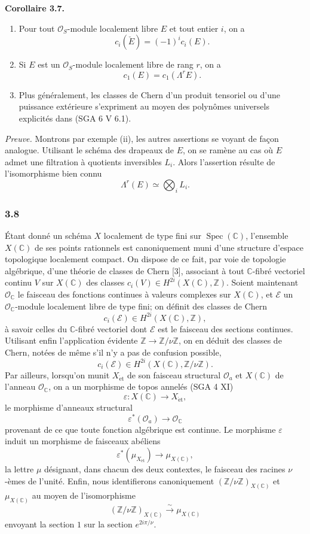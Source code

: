 \documentclass[11pt]{article}
\newenvironment{statement}[1]{\par\medskip\noindent\textbf{#1.}\ }{\par\medskip}
\providecommand{\et}{\mathrm{\acute{e}t}}
\providecommand{\et}{\acute{e}t}
\begin{document}
\begin{statement}{Corollaire 3.7}
\begin{enumerate}[label=(\roman*)]
\item Pour tout $\mathcal O_S$-module localement libre $E$ et tout entier $i$, on a
\[
c_i(\check E)=(-1)^i c_i(E).
\]
\item Si $E$ est un $\mathcal O_S$-module localement libre de rang $r$, on a
\[
c_1(E)=c_1(\Lambda^rE).
\]
\item Plus généralement, les classes de Chern d'un produit tensoriel ou d'une puissance extérieure s'expriment au moyen des polynômes universels explicités dans (SGA 6 V 6.1).
\end{enumerate}
\end{statement}

\emph{Preuve.} Montrons par exemple (ii), les autres assertions se voyant de façon analogue. Utilisant le schéma des drapeaux de $E$, on se ramène au cas où $E$ admet une filtration à quotients inversibles $L_i$. Alors l'assertion résulte de l'isomorphisme bien connu
\[
\Lambda^r(E)\simeq\bigotimes_i L_i.
\]

\subsubsection*{3.8}
Étant donné un schéma $X$ localement de type fini sur $\operatorname{Spec}(\mathbb C)$, l'ensemble $X(\mathbb C)$ de ses points rationnels est canoniquement muni d'une structure d'espace topologique localement compact. On dispose de ce fait, par voie de topologie algébrique, d'une théorie de classes de Chern [3], associant à tout $\mathbb C$-fibré vectoriel continu $V$ sur $X(\mathbb C)$ des classes $c_i(V)\in H^{2i}(X(\mathbb C),\mathbb Z)$. Soient maintenant $\mathcal O_\mathbb C$ le faisceau des fonctions continues à valeurs complexes sur $X(\mathbb C)$, et $\mathcal E$ un $\mathcal O_\mathbb C$-module localement libre de type fini; on définit des classes de Chern
\[
c_i(\mathcal E)\in H^{2i}(X(\mathbb C),\mathbb Z),
\]
à savoir celles du $\mathbb C$-fibré vectoriel dont $\mathcal E$ est le faisceau des sections continues. Utilisant enfin l'application évidente $\mathbb Z\to\mathbb Z/\nu\mathbb Z$, on en déduit des classes de Chern, notées de même s'il n'y a pas de confusion possible,
\[
c_i(\mathcal E)\in H^{2i}(X(\mathbb C),\mathbb Z/\nu\mathbb Z).
\tag{3.8.1}
\]
Par ailleurs, lorsqu'on munit $X_{\et}$ de son faisceau structural $\mathcal O_a$ et $X(\mathbb C)$ de l'anneau $\mathcal O_\mathbb C$, on a un morphisme de topos annelés (SGA 4 XI)
\[
\varepsilon:X(\mathbb C)\to X_{\et},
\]
le morphisme d'anneaux structural
\[
\varepsilon^*(\mathcal O_a)\to\mathcal O_\mathbb C
\tag{3.8.2}
\]
provenant de ce que toute fonction algébrique est continue. Le morphisme $\varepsilon$ induit un morphisme de faisceaux abéliens
\[
\varepsilon^*(\mu_{X_{\et}})\to \mu_{X(\mathbb C)},
\tag{3.8.3}
\]
la lettre $\mu$ désignant, dans chacun des deux contextes, le faisceau des racines $\nu$-èmes de l'unité. Enfin, nous identifierons canoniquement $(\mathbb Z/\nu\mathbb Z)_{X(\mathbb C)}$ et $\mu_{X(\mathbb C)}$ au moyen de l'isomorphisme
\[
(\mathbb Z/\nu\mathbb Z)_{X(\mathbb C)}
 \xrightarrow{\sim}\mu_{X(\mathbb C)}
\tag{3.8.4}
\]
envoyant la section $1$ sur la section $e^{2i\pi/\nu}$.
\end{document}

